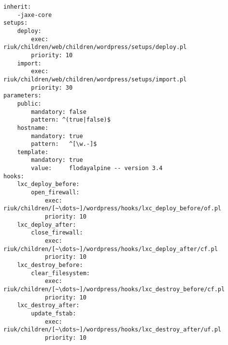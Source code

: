 \begin{lstlisting}[caption={config.yml}, label=fig_1.3_config]
inherit:
	-jaxe-core
setups:
	deploy:
		exec:     riuk/children/web/children/wordpress/setups/deploy.pl
		priority: 10
	import:
		exec:     riuk/children/web/children/wordpress/setups/import.pl
		priority: 30
parameters:
	public:
		mandatory: false
		pattern: ^(true|false)$
	hostname:
		mandatory: true
		pattern:   ^[\w.-]$
	template:
		mandatory: true
		value:     flodayalpine -- version 3.4
hooks:
	lxc_deploy_before:
		open_firewall:
			exec:     riuk/children/[~\dots~]/wordpress/hooks/lxc_deploy_before/of.pl
			priority: 10
	lxc_deploy_after:
		close_firewall:
			exec:     riuk/children/[~\dots~]/wordpress/hooks/lxc_deploy_after/cf.pl
			priority: 10
	lxc_destroy_before:
		clear_filesystem:
			exec:     riuk/children/[~\dots~]/wordpress/hooks/lxc_destroy_before/cf.pl
			priority: 10
	lxc_destroy_after:
		update_fstab:
			exec:     riuk/children/[~\dots~]/wordpress/hooks/lxc_destroy_after/uf.pl
			priority: 10
\end{lstlisting}
